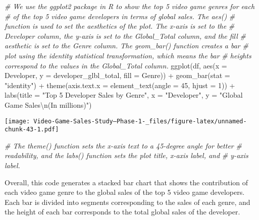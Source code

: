 \documentclass[
]{article}
\newenvironment{Shaded}{\begin{snugshade}}{\end{snugshade}}
\newcommand{\AttributeTok}[1]{\textcolor[rgb]{0.77,0.63,0.00}{#1}}
\newcommand{\CommentTok}[1]{\textcolor[rgb]{0.56,0.35,0.01}{\textit{#1}}}
\newcommand{\DecValTok}[1]{\textcolor[rgb]{0.00,0.00,0.81}{#1}}
\newcommand{\FunctionTok}[1]{\textcolor[rgb]{0.00,0.00,0.00}{#1}}
\newcommand{\NormalTok}[1]{#1}
\newcommand{\SpecialCharTok}[1]{\textcolor[rgb]{0.00,0.00,0.00}{#1}}
\newcommand{\StringTok}[1]{\textcolor[rgb]{0.31,0.60,0.02}{#1}}
\begin{document}
\begin{Shaded}
\begin{Highlighting}[]
\CommentTok{\# We use the ggplot2 package in R to show the top 5 video game genres for each}
\CommentTok{\# of the top 5 video game developers in terms of global sales. The aes()}
\CommentTok{\# function is used to set the aesthetics of the plot. The x{-}axis is set to the}
\CommentTok{\# Developer column, the y{-}axis is set to the Global\_Total column, and the fill}
\CommentTok{\# aesthetic is set to the Genre column. The geom\_bar() function creates a bar}
\CommentTok{\# plot using the \textquotesingle{}identity\textquotesingle{} statistical transformation, which means the bar}
\CommentTok{\# heights correspond to the values in the Global\_Total column.}
\FunctionTok{ggplot}\NormalTok{(df, }\FunctionTok{aes}\NormalTok{(}\AttributeTok{x =}\NormalTok{ Developer, }\AttributeTok{y =}\NormalTok{ developer\_glbl\_total, }\AttributeTok{fill =}\NormalTok{ Genre)) }\SpecialCharTok{+} \FunctionTok{geom\_bar}\NormalTok{(}\AttributeTok{stat =} \StringTok{"identity"}\NormalTok{) }\SpecialCharTok{+}
    \FunctionTok{theme}\NormalTok{(}\AttributeTok{axis.text.x =} \FunctionTok{element\_text}\NormalTok{(}\AttributeTok{angle =} \DecValTok{45}\NormalTok{, }\AttributeTok{hjust =} \DecValTok{1}\NormalTok{)) }\SpecialCharTok{+} \FunctionTok{labs}\NormalTok{(}\AttributeTok{title =} \StringTok{"Top 5 Developer Sales by Genre"}\NormalTok{,}
    \AttributeTok{x =} \StringTok{"Developer"}\NormalTok{, }\AttributeTok{y =} \StringTok{"Global Game Sales}\SpecialCharTok{\textbackslash{}n}\StringTok{(In millions)"}\NormalTok{)}
\end{Highlighting}
\end{Shaded}

\texttt{[image: Video-Game-Sales-Study--Phase-1-\_files/figure-latex/unnamed-chunk-43-1.pdf]}

\begin{Shaded}
\begin{Highlighting}[]
\CommentTok{\# The theme() function sets the x{-}axis text to a 45{-}degree angle for better}
\CommentTok{\# readability, and the labs() function sets the plot title, x{-}axis label, and}
\CommentTok{\# y{-}axis label.}
\end{Highlighting}
\end{Shaded}

Overall, this code generates a stacked bar chart that shows the
contribution of each video game genre to the global sales of the top 5
video game developers. Each bar is divided into segments corresponding
to the sales of each genre, and the height of each bar corresponds to
the total global sales of the developer.
\end{document}
